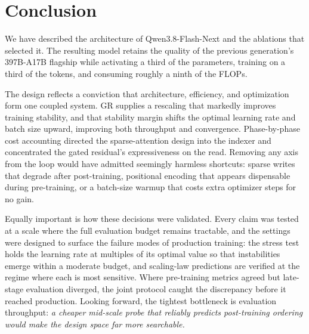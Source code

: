 \section{Conclusion}

We have described the architecture of Qwen3.8-Flash-Next and the ablations that selected it. The resulting model retains the quality of the previous generation's 397B-A17B flagship while activating a third of the parameters, training on a third of the tokens, and consuming roughly a ninth of the FLOPs.

The design reflects a conviction that architecture, efficiency, and optimization form one coupled system. 
GR supplies a rescaling that markedly improves training stability, and that stability margin shifts the optimal learning rate and batch size upward, improving both throughput and convergence. 
Phase-by-phase cost accounting directed the sparse-attention design into the indexer and concentrated the gated residual's expressiveness on the read. 
Removing any axis from the loop would have admitted seemingly harmless shortcuts: sparse writes that degrade after post-training, positional encoding that appears dispensable during pre-training, or a batch-size warmup that costs extra optimizer steps for no gain.

Equally important is how these decisions were validated. Every claim was tested at a scale where the full evaluation budget remains tractable, and the settings were designed to surface the failure modes of production training: the stress test holds the learning rate at multiples of its optimal value so that instabilities emerge within a moderate budget, and scaling-law predictions are verified at the regime where each is most sensitive. Where pre-training metrics agreed but late-stage evaluation diverged, the joint protocol caught the discrepancy before it reached production. Looking forward, the tightest bottleneck is evaluation throughput: \textit{a cheaper mid-scale probe that reliably predicts post-training ordering would make the design space far more searchable.}